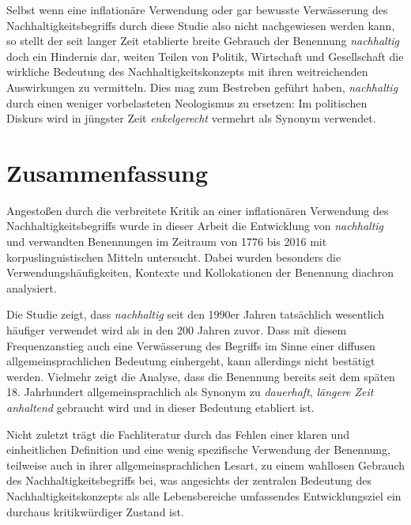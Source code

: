 \documentclass[
    german,
    a4paper,%
    12pt,%
    oneside,%
    toc=bibliography,
    final,
]{scrartcl}
\begin{document}
Selbst wenn eine inflationäre Verwendung oder gar bewusste Verwässerung des Nachhaltigkeitsbegriffs durch diese Studie also nicht nachgewiesen werden kann, so stellt der seit langer Zeit etablierte breite Gebrauch der Benennung \textit{nachhaltig} doch ein Hindernis dar, weiten Teilen von Politik, Wirtschaft und Gesellschaft die wirkliche Bedeutung des Nachhaltigkeitskonzepts mit ihren weitreichenden Auswirkungen zu vermitteln. Dies mag zum Bestreben geführt haben, \textit{nachhaltig} durch einen weniger vorbelasteten Neologismus zu ersetzen: Im politischen Diskurs wird in jüngster Zeit \textit{enkelgerecht} vermehrt als Synonym verwendet.

\section{Zusammenfassung}
\label{sec:zusammenfassung}

Angestoßen durch die verbreitete Kritik an einer inflationären Verwendung  des Nachhaltigkeitsbegriffs wurde in dieser Arbeit die Entwicklung von \textit{nachhaltig} und verwandten Benennungen im Zeitraum von 1776 bis 2016 mit korpuslinguistischen Mitteln untersucht. Dabei wurden besonders die Verwendungshäufigkeiten, Kontexte und Kollokationen der Benennung diachron analysiert.

Die Studie zeigt, dass \textit{nachhaltig} seit den 1990er Jahren tatsächlich wesentlich häufiger verwendet wird als in den 200 Jahren zuvor. Dass mit diesem Frequenzanstieg auch eine Verwässerung des Begriffs im Sinne einer diffusen allgemeinsprachlichen Bedeutung einhergeht, kann allerdings nicht bestätigt werden. Vielmehr zeigt die Analyse, dass die Benennung bereits seit dem späten 18. Jahrhundert allgemeinsprachlich als Synonym zu \textit{dauerhaft}, \textit{längere Zeit anhaltend} gebraucht wird und in dieser Bedeutung etabliert ist.

Nicht zuletzt trägt die Fachliteratur durch das Fehlen einer klaren und einheitlichen Definition und eine wenig spezifische Verwendung der Benennung, teilweise auch in ihrer allgemeinsprachlichen Lesart, zu einem wahllosen Gebrauch des Nachhaltigkeitsbegriffs bei, was angesichts der zentralen Bedeutung des Nachhaltigkeitskonzepts als alle Lebensbereiche umfassendes Entwicklungsziel ein durchaus kritikwürdiger Zustand ist.
\end{document}
